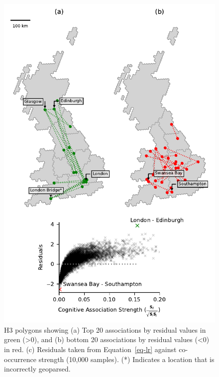 \documentclass[
  letterpaper,
  11pt,
  english,
  onehalfspacing,
  headsepline]{MastersDoctoralThesis}
\begin{document}
\begin{figure}

{\centering \includegraphics{04_connections/04_figures/fig-resid-output-1.pdf}

}

\caption{\label{fig-resid}H3 polygons showing (a) Top 20 associations by
residual values in green (\textgreater0), and (b) bottom 20 associations
by residual values (\textless0) in red. (c) Residuals taken from
Equation~\ref{eq-lr} against co-occurrence strength (10,000 samples).
(*) Indicates a location that is incorrectly geoparsed.}

\end{figure}
\end{document}
